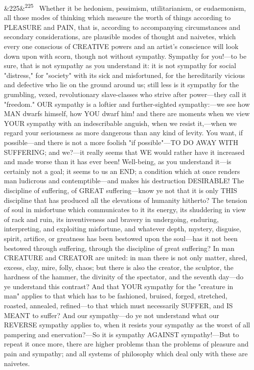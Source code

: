 \documentclass[12pt]{article}
\newcommand{\para}[1][]{\par\noindent\ifx&#1&\else\textsuperscript{\footnotesize #1}~\fi}
\begin{document}
\para[225] Whether it be hedonism, pessimism, utilitarianism, or eudaemonism, all those modes of thinking which measure the worth of things according to PLEASURE and PAIN, that is, according to accompanying circumstances and secondary considerations, are plausible modes of thought and naivetes, which every one conscious of CREATIVE powers and an artist's conscience will look down upon with scorn, though not without sympathy. Sympathy for you!---to be sure, that is not sympathy as you understand it: it is not sympathy for social "distress," for "society" with its sick and misfortuned, for the hereditarily vicious and defective who lie on the ground around us; still less is it sympathy for the grumbling, vexed, revolutionary slave-classes who strive after power---they call it "freedom." OUR sympathy is a loftier and further-sighted sympathy:---we see how MAN dwarfs himself, how YOU dwarf him! and there are moments when we view YOUR sympathy with an indescribable anguish, when we resist it,---when we regard your seriousness as more dangerous than any kind of levity. You want, if possible---and there is not a more foolish "if possible"---TO DO AWAY WITH SUFFERING; and we?---it really seems that WE would rather have it increased and made worse than it has ever been! Well-being, as you understand it---is certainly not a goal; it seems to us an END; a condition which at once renders man ludicrous and contemptible---and makes his destruction DESIRABLE! The discipline of suffering, of GREAT suffering---know ye not that it is only THIS discipline that has produced all the elevations of humanity hitherto? The tension of soul in misfortune which communicates to it its energy, its shuddering in view of rack and ruin, its inventiveness and bravery in undergoing, enduring, interpreting, and exploiting misfortune, and whatever depth, mystery, disguise, spirit, artifice, or greatness has been bestowed upon the soul---has it not been bestowed through suffering, through the discipline of great suffering? In man CREATURE and CREATOR are united: in man there is not only matter, shred, excess, clay, mire, folly, chaos; but there is also the creator, the sculptor, the hardness of the hammer, the divinity of the spectator, and the seventh day---do ye understand this contrast? And that YOUR sympathy for the "creature in man" applies to that which has to be fashioned, bruised, forged, stretched, roasted, annealed, refined---to that which must necessarily SUFFER, and IS MEANT to suffer? And our sympathy---do ye not understand what our REVERSE sympathy applies to, when it resists your sympathy as the worst of all pampering and enervation?---So it is sympathy AGAINST sympathy!---But to repeat it once more, there are higher problems than the problems of pleasure and pain and sympathy; and all systems of philosophy which deal only with these are naivetes.
\end{document}
